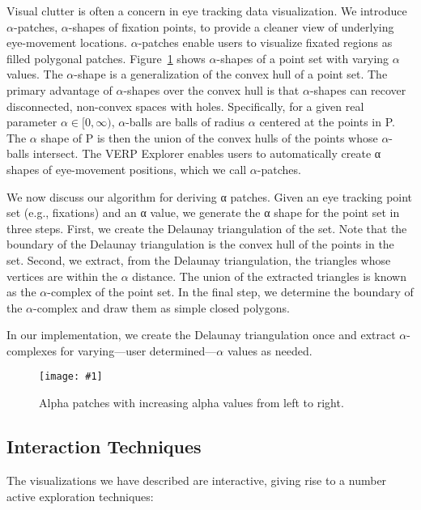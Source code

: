 \documentclass{sigchi}
\newcommand{\insertpicture}[2]{\begin{center}\texttt{[image: \#1]}\end{center}}
\begin{document}
Visual clutter is often a concern in eye tracking data visualization.  We
introduce $\alpha$-patches, $\alpha$-shapes of fixation points, to provide
a cleaner view of underlying eye-movement locations.  $\alpha$-patches
enable users to visualize fixated regions as filled polygonal patches.
Figure~\ref{fig:alphapatch} shows $\alpha$-shapes of a point set with varying $\alpha$ values.
The $\alpha$-shape is a generalization of the convex hull of a point set.
The primary advantage of $\alpha$-shapes over the convex hull is that
$\alpha$-shapes can recover disconnected, non-convex spaces with holes.
Specifically, for a given real parameter $\alpha \in [0,\infty)$,
	$\alpha$-balls are balls of radius $\alpha$ centered at the points in P.
	The $\alpha$ shape of P is then the union of the convex hulls of the
	points whose $\alpha$-balls intersect.  The VERP Explorer enables users
	to automatically create α shapes of eye-movement positions, which we call
	$\alpha$-patches.  

	We now discuss our algorithm for deriving α patches. Given an eye
	tracking point set (e.g., fixations) and an α value, we generate the α
	shape for the point set in three steps. First, we create the Delaunay
	triangulation of the set.  Note that the boundary of the Delaunay
	triangulation is the convex hull of the points in the set. Second, we
	extract, from the Delaunay triangulation, the triangles whose vertices
	are within the $\alpha$  distance.   The union of the extracted triangles
	is known as the $\alpha$-complex of the point set. In the final step, we
	determine the boundary of the $\alpha$-complex and draw them as simple
	closed polygons. 
	
	In our implementation, we create the Delaunay triangulation once and
	extract $\alpha$-complexes for varying---user determined---$\alpha$
	values as needed.

	\begin{figure}

		\insertpicture{figures/alphapatch.pdf}{0.5}
		\caption{Alpha patches with increasing alpha values from left to
			right. \label{fig:alphapatch}}

	\end{figure}


	\subsection{Interaction Techniques}  The visualizations we have described
are interactive, giving rise to a number active exploration techniques: 
\end{document}
